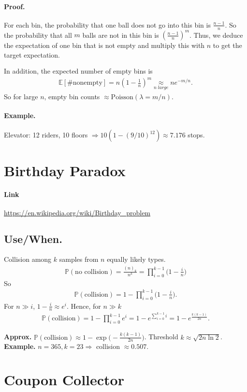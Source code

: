\documentclass[11pt,A4,twoside]{article}
\let\oldsection\section
\renewcommand{\section}{\FloatBarrier\oldsection}
\let\oldsubsection\subsection
\renewcommand{\subsection}{\FloatBarrier\oldsubsection}
\numberwithin{equation}{section}
\newcommand{\E}{\mathbb{E}}
\theoremstyle{definition}
\theoremstyle{remark}
\newcommand\bal{\begin{aligned}}
\newcommand\eal{\end{aligned}}
\newcommand{\beql}[1]{\begin{equation}\label{#1}\bal}
\newcommand{\eeql}{\eal\end{equation}}
\newcommand{\Prob}{\mathbb{P}}
\begin{document}
\paragraph{Proof.} For each bin, the probability that one ball does not go into this bin is $\frac{n-1}{n}$. So the probability that all $m$ balls are not in this bin is     $\left(\frac{n-1}{n}\right) ^ m$. Thus, we deduce the expectation of one bin that is not empty and multiply this with $n$ to get the target expectation.

In addition, the expected number of empty bins is 
\beql{}
\E[\#\text{nonempty}]=n\left(1-\frac1 n\right)^m \underset{n \; large}{\approx} ne^{-m/n}.
\eeql 
So for large \(n\), empty bin counts \(\approx \mathrm{Poisson}(\lambda=m/n)\).
\paragraph{Example.} Elevator: 12 riders, 10 floors \(\Rightarrow 10(1-(9/10)^{12})\approx 7.176\) stops.

\section{Birthday Paradox}
\paragraph{Link} \url{https://en.wikipedia.org/wiki/Birthday_problem}

\subsection{Use/When.} Collision among \(k\) samples from \(n\) equally likely types.
\beql{}\Prob(\text{no collision})=\frac{(n)_k}{n^k}=\prod_{i=0}^{k-1}\Big(1-\frac{i}{n}\Big)
\eeql
So
\beql{}
\Prob(\text{collision}) = 1-\prod_{i=0}^{k-1}\Big(1-\frac{i}{n}\Big).
\eeql
For $n\gg i$, $1-\frac{i}{n} \approx e^{i}$. Hence, for $n \gg k$
\beql{}
\Prob(\text{collision}) = 1-\prod_{i=0}^{k-1}e^i = 1 - e^{\sum_{i = 0}^{k-1} i} = 1-e^{\frac{k(k-1)}{2n}}.
\eeql

\textbf{Approx.} \(\Prob(\text{collision})\approx 1-\exp\!\big(-\tfrac{k(k-1)}{2n}\big)\). Threshold \(k\approx \sqrt{2n\ln 2}\).\\
\textbf{Example.} \(n=365,k=23\Rightarrow\) collision \(\approx 0.507\).

\section{Coupon Collector}
\end{document}
